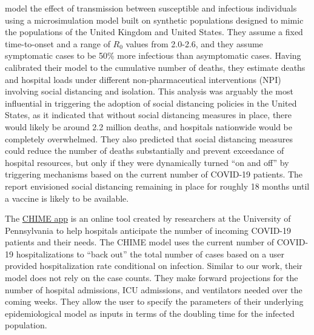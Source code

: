 \documentclass[11pt]{article}
\theoremstyle{plain}
\newcommand{\1}{\mathbf 1}
\begin{document}
\citet{ferguson2020impact} model the effect of transmission between susceptible and infectious individuals using a microsimulation model built on synthetic populations designed to mimic the populations of the United Kingdom and United States. They assume a fixed time-to-onset and a range of $R_0$ values from 2.0-2.6, and they assume symptomatic cases to be 50\% more infectious than asymptomatic cases. Having calibrated their model to the cumulative number of deaths, they estimate deaths and hospital loads under different non-pharmaceutical interventions (NPI) involving social distancing and isolation. This analysis was arguably the most influential in triggering the adoption of social distancing policies in the United States, as it indicated that without social distancing measures in place, there would likely be around 2.2 million deaths, and hospitals nationwide would be completely overwhelmed. They also predicted that social distancing measures could reduce the number of deaths substantially and prevent exceedance of hospital resources, but only if they were dynamically turned ``on and off'' by triggering mechanisms based on the current number of COVID-19 patients. The report envisioned social distancing remaining in place for roughly 18 months until a vaccine is likely to be available.

The \href{https://penn-chime.phl.io/}{CHIME app} \cite{weissman2020locally} is an online tool created by researchers at the University of Pennsylvania to help hospitals anticipate the number of incoming COVID-19 patients and their needs. The CHIME model uses the current number of COVID-19 hospitalizations to ``back out'' the total number of cases based on a user provided hospitalization rate conditional on infection. Similar to our work, their model does not rely on the case counts. They make forward projections for the number of hospital admissions, ICU admissions, and ventilators needed over the coming weeks. They allow the user to specify the parameters of their underlying epidemiological model as inputs in terms of the doubling time for the infected population. %
\end{document}
